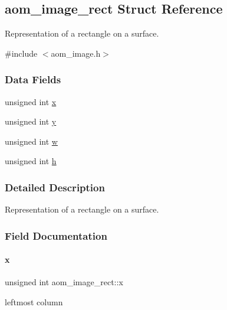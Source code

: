 \hypertarget{structaom__image__rect}{}\subsection{aom\+\_\+image\+\_\+rect Struct Reference}
\label{structaom__image__rect}


Representation of a rectangle on a surface.  




{\ttfamily \#include $<$aom\+\_\+image.\+h$>$}

\subsubsection*{Data Fields}
\begin{DoxyCompactItemize}
\item 
unsigned int \hyperlink{structaom__image__rect_a65666b611b562e24a50ff180c13e6120}{x}
\item 
unsigned int \hyperlink{structaom__image__rect_ad96b4a0053a7b2d145f709f903a13cff}{y}
\item 
unsigned int \hyperlink{structaom__image__rect_aed38fa7222f10a140eded2293da8df10}{w}
\item 
unsigned int \hyperlink{structaom__image__rect_aa018a037ad51dc1ed6e3208e66ba1ca3}{h}
\end{DoxyCompactItemize}


\subsubsection{Detailed Description}
Representation of a rectangle on a surface. 

\subsubsection{Field Documentation}
\mbox{\label{structaom__image__rect_a65666b611b562e24a50ff180c13e6120}} 
\paragraph{\texorpdfstring{x}{x}}
{\footnotesize\ttfamily unsigned int aom\+\_\+image\+\_\+rect\+::x}

leftmost column \mbox{\label{structaom__image__rect_ad96b4a0053a7b2d145f709f903a13cff}} 
